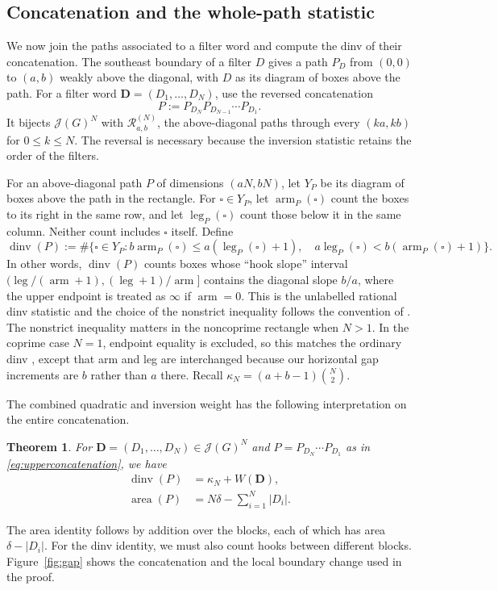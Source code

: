 \documentclass[12pt,reqno]{amsart}
\numberwithin{equation}{section}
\newtheorem{theorem}{Theorem}[section]
\theoremstyle{definition}
\theoremstyle{remark}
\theoremstyle{plain}
\DeclareMathOperator{\area}{area}
\DeclareMathOperator{\arm}{arm}
\DeclareMathOperator{\leg}{leg}
\DeclareMathOperator{\dinv}{dinv}
\newcommand{\Rpaths}{\mathcal R_{a,b}^{(N)}}
\begin{document}
\subsection{Concatenation and the whole-path statistic}
We now join the paths associated to a filter word and compute the dinv
of their concatenation.  The southeast boundary of a filter $D$ gives a path $P_D$ from $(0,0)$
to $(a,b)$ weakly above the diagonal, with $D$ as its diagram of boxes
above the path.   For a filter word
$\boldsymbol D=(D_1,\ldots,D_N)$, use the reversed concatenation
\begin{equation}\label{eq:upperconcatenation}
 P:=P_{D_N}P_{D_{N-1}}\cdots P_{D_1}.
\end{equation}
It bijects $\mathcal J(G)^N$ with $\Rpaths$, the above-diagonal paths
through every $(ka,kb)$ for $0\le k\le N$.
The reversal is necessary because the inversion statistic retains the
order of the filters.

For an above-diagonal path $P$ of dimensions $(aN,bN)$, let $Y_P$
be its diagram of boxes above the path in the rectangle.
For $\square\in Y_P$, let $\arm_P(\square)$ count the boxes to its right
in the same row, and let $\leg_P(\square)$ count those below it in the
same column.  Neither count includes $\square$ itself.  Define
\begin{equation}\label{eq:hook}
 \dinv(P):=\#\{\square\in Y_P:
 b\arm_P(\square)\le a(\leg_P(\square)+1),\quad
 a\leg_P(\square)<b(\arm_P(\square)+1)\}.
\end{equation}
In other words, $\dinv(P)$ counts boxes whose ``hook slope'' interval $(\leg/(\arm+1),(\leg+1)/\arm]$ contains the diagonal slope $b/a$, where the upper endpoint is treated as $\infty$ if $\arm=0$.
This is the unlabelled rational dinv statistic and the choice of the nonstrict inequality follows the convention of
\cite[Algorithm~6.1(3), p.~21]{BGLX}.
The nonstrict inequality matters in the noncoprime rectangle when $N>1$. In the coprime case $N=1$, endpoint equality is excluded, so this matches the ordinary dinv \cite[Section~1.2]{Huang}, except that arm and leg are interchanged because our horizontal gap increments are $b$ rather than $a$ there. 
Recall $\kappa_N=(a+b-1)\binom N2$.

The combined quadratic and inversion weight has the following
interpretation on the entire concatenation.

\begin{theorem}\label{thm:worddinv}
For $\boldsymbol D=(D_1,\ldots,D_N)\in\mathcal J(G)^N$ and
$P=P_{D_N}\cdots P_{D_1}$ as in \eqref{eq:upperconcatenation}, we have
\begin{align}
 \dinv(P)&=\kappa_N+W(\boldsymbol D),\label{eq:pointwisedinv}\\
 \area(P)&=N\delta-\sum_{i=1}^N|D_i|.\label{eq:wordarea}
\end{align}
\end{theorem}
The area identity follows by addition over the blocks, each of which has
area $\delta-|D_i|$.  For the dinv identity, we must also count hooks
between different blocks.  Figure~\ref{fig:gap} shows the concatenation
and the local boundary change used in the proof.
\end{document}

